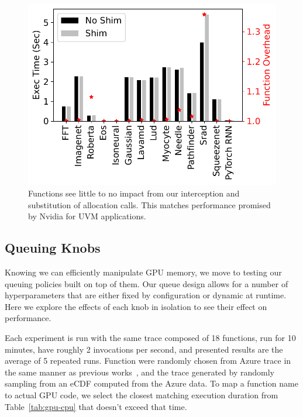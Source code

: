 \begin{figure}
  \centering
  \includegraphics{mqfq/graphs/driver-compare/8-exec_time.pdf}
  \caption{Functions see little to no impact from our interception and substitution of allocation calls.
          This matches performance promised by Nvidia for UVM applications.}
    \label{fig:shim-overhead}
\end{figure}

\subsection{Queuing Knobs}
\label{sec:queue-knobs}

Knowing we can efficiently manipulate GPU memory, we move to testing our queuing policies built on top of them.
Our queue design allows for a number of hyperparameters that are either fixed by configuration or dynamic at runtime.
Here we explore the effects of each knob in isolation to see their effect on performance.

Each experiment is run with the same trace composed of 18 functions, run for 10 minutes, have roughly 2 invocations per second, and presented results are the average of 5  repeated runs.
Function were randomly chosen from Azure trace in the same manner as previous works~\cite{fuerst2023iluvatar,faaslb-hpdc22}, and the trace generated by randomly sampling from an eCDF computed from the Azure data.
To map a function name to actual GPU code, we select the closest matching execution duration from Table~\ref{tab:gpu-cpu} that doesn't exceed that time.

